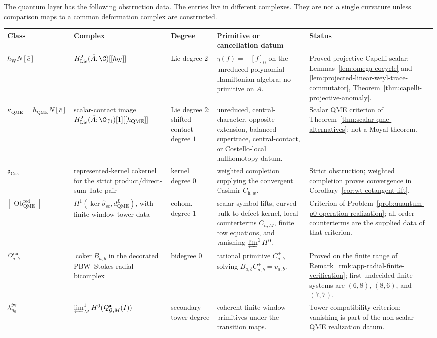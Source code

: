 \documentclass[11pt]{memoir}
\begin{document}
\medskip\noindent
The quantum layer has the following obstruction data.  The entries live
in different complexes.  They are not a single curvature unless
comparison maps to a common deformation complex are constructed.
\begin{center}
\footnotesize
\renewcommand{\arraystretch}{1.16}
\begin{tabularx}{\textwidth}{@{}>{\raggedright\arraybackslash}p{}
  >{\raggedright\arraybackslash}p{}
  >{\raggedright\arraybackslash}p{}
  >{\raggedright\arraybackslash}p{}
  X@{}}
  \textbf{Class} & \textbf{Complex} & \textbf{Degree} &
  \textbf{Primitive or cancellation datum} & \textbf{Status}\\\hline
  \(\hbar_{\mathrm{W}}N[\bar c]\) &
  \(H^2_{\mathrm{Lie}}(\bar A,\C)[[\hbar_{\mathrm{W}}]]\) &
  Lie degree \(2\) &
  \(\eta(f)=-[f]_0\) on the unreduced polynomial Hamiltonian algebra;
  no primitive on \(\bar A\). &
  Proved projective Capelli scalar:
  Lemmas~\ref{lem:omega-cocycle} and
  \ref{lem:projected-linear-weyl-trace-commutator},
  Theorem~\ref{thm:capelli-projective-anomaly}.\\
  \(\kappa_{\mathrm{QME}}=\hbar_{\mathrm{QME}}N[\bar c]\) &
  scalar-contact image
  \(H^2_{\mathrm{Lie}}(\bar A;\C\gamma_1)[1][[\hbar_{\mathrm{QME}}]]\) &
  Lie degree \(2\); shifted contact degree \(1\) &
  unreduced, central-character, opposite-extension, balanced-supertrace,
  central-contact, or Costello-local nullhomotopy datum. &
  Scalar QME criterion of
  Theorem~\ref{thm:scalar-qme-alternatives}; not a Moyal theorem.\\
  \(\mathfrak o_{\mathrm{Cas}}\) &
  represented-kernel cokernel for the strict product/direct-sum Tate
  pair &
  kernel degree \(0\) &
  weighted completion supplying the convergent Casimir
  \(C_{\mathfrak h,w}\). &
  Strict obstruction; weighted completion proves convergence in
  Corollary~\ref{cor:wt-cotangent-lift}.\\
  \([\operatorname{Ob}^{\mathrm{red}}_{\mathrm{QME}}]\) &
  \(H^1(\ker\widehat\sigma_{\mathrm{sc}},d^L_{\mathrm{QME}})\), with
  finite-window tower data &
  cohom. degree \(1\) &
  scalar-symbol lifts, curved bulk-to-defect kernel, local counterterms
  \(C_{n,M}\), finite row equations, and vanishing
  \(\varprojlim^1H^0\). &
  Criterion of Problem~\ref{prob:quantum-p0-operation-realization};
  all-order counterterms are the supplied data of that criterion.\\
  \(\Omega^{\mathrm{rad}}_{a,b}\) &
  \(\operatorname{coker}B_{a,b}\) in the decorated PBW--Stokes radial
  bicomplex &
  bidegree \(0\) &
  rational primitive \(C^+_{a,b}\) solving
  \(B_{a,b}C^+_{a,b}=v_{a,b}\). &
  Proved on the finite range of
  Remark~\ref{rmk:app-radial-finite-verification}; first undecided
  finite systems are \((6,8)\), \((8,6)\), and \((7,7)\).\\
  \(\lambda^{\mathrm{fw}}_{n_0}\) &
  \(\varprojlim^1_M H^0(\mathcal Q^\bullet_{\mathcal G,M}(I))\) &
  secondary tower degree &
  coherent finite-window primitives under the transition maps. &
  Tower-compatibility criterion; vanishing is part of the non-scalar QME
  realization datum.
\end{tabularx}
\end{center}
\end{document}

